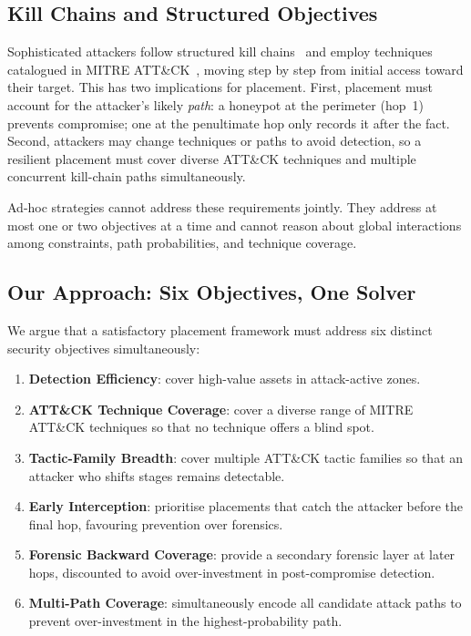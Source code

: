 \documentclass[journal]{IEEEtran}
\begin{document}
\subsection{Kill Chains and Structured Objectives}
Sophisticated attackers follow structured kill chains~\cite{hutchins2011}
and employ techniques catalogued in MITRE ATT\&CK~\cite{mitre2023},
moving step by step from initial access toward their target. This has
two implications for placement. First, placement must account for the
attacker's likely \emph{path}: a honeypot at the perimeter (hop~1)
prevents compromise; one at the penultimate hop only records it after
the fact. Second, attackers may change techniques or paths to avoid
detection, so a resilient placement must cover diverse ATT\&CK
techniques and multiple concurrent kill-chain paths simultaneously.

Ad-hoc strategies cannot address these requirements jointly. They
address at most one or two objectives at a time and cannot reason
about global interactions among constraints, path probabilities, and
technique coverage.

\subsection{Our Approach: Six Objectives, One Solver}
We argue that a satisfactory placement framework must address six
distinct security objectives simultaneously:

\begin{enumerate}[label=O\arabic*.]
  \item \textbf{Detection Efficiency}: cover high-value assets in
    attack-active zones.
  \item \textbf{ATT\&CK Technique Coverage}: cover a diverse range of
    MITRE ATT\&CK techniques so that no technique offers a blind spot.
  \item \textbf{Tactic-Family Breadth}: cover multiple ATT\&CK tactic
    families so that an attacker who shifts stages remains detectable.
  \item \textbf{Early Interception}: prioritise placements that catch
    the attacker before the final hop, favouring prevention over
    forensics.
  \item \textbf{Forensic Backward Coverage}: provide a secondary
    forensic layer at later hops, discounted to avoid over-investment
    in post-compromise detection.
  \item \textbf{Multi-Path Coverage}: simultaneously encode all
    candidate attack paths to prevent over-investment in the
    highest-probability path.
\end{enumerate}
\end{document}
